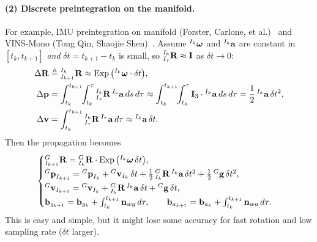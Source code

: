 \paragraph{(2) Discrete preintegration on the manifold.} For example, IMU preintegration on manifold (Forster, Carlone, et al.)~\cite{Forster2017tro} and VINS-Mono (Tong Qin, Shaojie Shen)~\cite{Qin2017TRO}. Assume ${}^{I_k}\boldsymbol{\mathbf{\omega}}$ and ${}^{I_k}\boldsymbol{\mathbf{a}}$ are constant in $[t_k, t_{k+1}]$ \emph{and} $\delta t = t_{k+1} - t_k$ is small, so ${}^{I_k}_{I_\tau}\boldsymbol{\mathbf{R}} \approx \boldsymbol{\mathbf{I}}$ as $\delta t \to 0$:
\begin{align}
\Delta\boldsymbol{\mathbf{R}} &\triangleq {}^{I_k}_{I_{k+1}}\boldsymbol{\mathbf{R}} \approx \operatorname{Exp}\big({}^{I_k}\boldsymbol{\mathbf{\omega}}\cdot\delta t\big), \\
\Delta\boldsymbol{\mathbf{p}} &= \int_{t_k}^{t_{k+1}}\!\!\int_{t_k}^{\tau} {}^{I_k}_{I_s}\boldsymbol{\mathbf{R}}\,{}^{I_s}\boldsymbol{\mathbf{a}}\,ds\,d\tau
\approx \int_{t_k}^{t_{k+1}}\!\!\int_{t_k}^{\tau} \boldsymbol{\mathbf{I}}_3\cdot{}^{I_k}\boldsymbol{\mathbf{a}}\,ds\,d\tau
= \frac{1}{2}\,{}^{I_k}\boldsymbol{\mathbf{a}}\,\delta t^2, \\
\Delta\boldsymbol{\mathbf{v}} &= \int_{t_k}^{t_{k+1}} {}^{I_k}_{I_\tau}\boldsymbol{\mathbf{R}}\,{}^{I_\tau}\boldsymbol{\mathbf{a}}\,d\tau
\approx {}^{I_k}\boldsymbol{\mathbf{a}}\,\delta t.
\end{align}
Then the propagation becomes
\begin{align}
\begin{cases}
{}^{G}_{I_{k+1}}\boldsymbol{\mathbf{R}} = {}^{G}_{I_k}\boldsymbol{\mathbf{R}}\cdot\operatorname{Exp}\big({}^{I_k}\boldsymbol{\mathbf{\omega}}\,\delta t\big), \\[2pt]
{}^{G}\boldsymbol{\mathbf{p}}_{I_{k+1}} = {}^{G}\boldsymbol{\mathbf{p}}_{I_k} + {}^{G}\boldsymbol{\mathbf{v}}_{I_k}\,\delta t + \frac{1}{2}\,{}^{G}_{I_k}\boldsymbol{\mathbf{R}}\,{}^{I_k}\boldsymbol{\mathbf{a}}\,\delta t^2 + \frac{1}{2}\,{}^{G}\boldsymbol{\mathbf{g}}\,\delta t^2, \\[2pt]
{}^{G}\boldsymbol{\mathbf{v}}_{I_{k+1}} = {}^{G}\boldsymbol{\mathbf{v}}_{I_k} + {}^{G}_{I_k}\boldsymbol{\mathbf{R}}\,{}^{I_k}\boldsymbol{\mathbf{a}}\,\delta t + {}^{G}\boldsymbol{\mathbf{g}}\,\delta t, \\[2pt]
\boldsymbol{\mathbf{b}}_{g_{k+1}} = \boldsymbol{\mathbf{b}}_{g_k} + \int_{t_k}^{t_{k+1}}\boldsymbol{\mathbf{n}}_{wg}\,d\tau, \qquad
\boldsymbol{\mathbf{b}}_{a_{k+1}} = \boldsymbol{\mathbf{b}}_{a_k} + \int_{t_k}^{t_{k+1}}\boldsymbol{\mathbf{n}}_{wa}\,d\tau.
\end{cases}
\end{align}
This is easy and simple, but it might lose some accuracy for fast rotation and low sampling rate ($\delta t$ larger).

